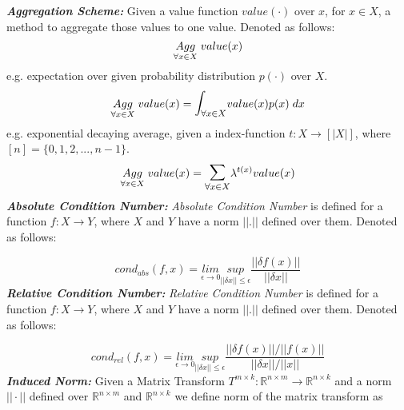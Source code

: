\textbf{\textit{Aggregation Scheme:}} Given a value function $value(\cdot)$ over $x$, for $x \in X$, a method to aggregate those values to one value. Denoted as follows:
\begin{equation}
\underset{\forall x\in X}{Agg}\hspace{1mm} value(x)
\end{equation}
e.g. expectation over given probability distribution $p(\cdot)$ over $X$.
\begin{equation}
\underset{\forall x\in X}{Agg}\hspace{1mm} value(x) = \mathlarger{\mathlarger{\int}}_{\forall x\in X} value(x)p(x)\hspace{1mm}dx
\end{equation}
e.g. exponential decaying average, given a index-function $t:X\to[|X|]$, where $[n] = \{0,1,2,...,n-1\}$.
\begin{equation}
\underset{\forall x\in X}{Agg}\hspace{1mm} value(x) = \mathlarger{\mathlarger{\sum}}_{\forall x\in X} \lambda^{t(x)}value(x)
\end{equation}
\newline
\textbf{\textit{Absolute Condition Number:}} \textit{Absolute Condition Number} is defined for a function $f: X \to Y$, where $X$ and $Y$ have a norm $||.||$ defined over them. Denoted as follows:

\begin{equation} \label{def_cond_abs}
cond_{abs}(f,x) = \underset{\epsilon \to 0}{lim}\underset{||\delta x||\le \epsilon}{sup} \frac{||\delta f(x)||}{||\delta x||}
\end{equation}
\newline
\textbf{\textit{Relative Condition Number:}} \textit{Relative Condition Number} is defined for a function $f: X \to Y$, where $X$ and $Y$ have a norm $||.||$ defined over them. Denoted as follows:

\begin{equation} \label{def_cond_rel}
cond_{rel}(f,x) = \underset{\epsilon \to 0}{lim}\underset{||\delta x||\le \epsilon}{sup} \frac{||\delta f(x)||/||f(x)||}{||\delta x||/||x||}
\end{equation}
\newline
\textbf{\textit{Induced Norm:}} Given a Matrix Transform $T^{m\times k}: \mathbb{R}^{n\times m} \to \mathbb{R}^{n\times k}$ and a norm $||\cdot||$ defined over $\mathbb{R}^{n\times m}$ and $\mathbb{R}^{n\times k}$ we define norm of the matrix transform as 

